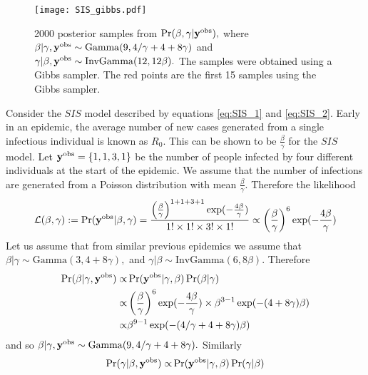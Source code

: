 \begin{figure}[htbp]
    \centering
    \texttt{[image: SIS\_gibbs.pdf]}
    \caption{
        2000 posterior samples from $\Pr(\beta, \gamma | \mathbf{y}^{\mathrm{obs}}),$ where
        $\beta|\gamma, \mathbf{y}^{\mathrm{obs}}
            \sim \mathrm{Gamma}(9, 4/\gamma + 4 + 8\gamma)$ and
        $\gamma|\beta, \mathbf{y}^{\mathrm{obs}}
            \sim \mathrm{InvGamma}(12, 12\beta).$ The samples were
        obtained using a Gibbs sampler.
        The red points are the first 15 samples using the Gibbs sampler.
    }
    \label{fig:gibbs_R}
\end{figure}

\begin{example}
    Consider the $SIS$ model described by equations \ref{eq:SIS_1}
    and \ref{eq:SIS_2}. Early in an epidemic, the average number of new
    cases generated from a single infectious individual is known as $R_0.$
    This can be shown to be $\frac{\beta}{\gamma}$ for the $SIS$ model.
    Let $\mathbf{y}^{\mathrm{obs}} = \{1, 1, 3, 1\}$ be the number of people infected by four
    different individuals at the start of the epidemic. We assume that the
    number of infections are generated from a Poisson distribution with mean
    $\frac{\beta}{\gamma}.$ Therefore the likelihood
    $$
        \mathcal{L}(\beta, \gamma):= \Pr(\mathbf{y}^{\mathrm{obs}} | \beta, \gamma)
        = \frac{
            \left(\frac{\beta}{\gamma}\right)^{1 + 1 + 3 + 1}
            \exp( -\frac{4\beta}{\gamma})
        }{
            1!\times 1! \times 3! \times 1!
        }
        \propto\left(\frac{\beta}{\gamma}\right)^{6}\exp( -\frac{4\beta}{\gamma})
    $$
    Let us assume that from similar previous epidemics we assume that
    $\beta | \gamma \sim \mathrm{Gamma}(3, 4 + 8\gamma),$ and
    $\gamma | \beta \sim \mathrm{InvGamma}(6, 8\beta).$ Therefore
    \begin{align*}
        \Pr(\beta|\gamma, \mathbf{y}^{\mathrm{obs}})
        \propto & \Pr(\mathbf{y}^{\mathrm{obs}}|\gamma, \beta)\Pr(\beta|\gamma)      \\
        \propto &
        \left(\frac{\beta}{\gamma}\right)^{6}
        \exp( -\frac{4\beta}{\gamma})
        \times \beta^{3 - 1}\exp(-(4 + 8\gamma)\beta)               \\
        \propto & \beta^{9 - 1}\exp(-(4/\gamma + 4 + 8\gamma)\beta)
    \end{align*}
    and so
    $\beta|\gamma, \mathbf{y}^{\mathrm{obs}}
        \sim \mathrm{Gamma}(9, 4/\gamma + 4 + 8\gamma).$
    Similarly
    \begin{align*}
        \Pr(\gamma|\beta, \by^\obs)
        \propto & \Pr(\by^\obs|\gamma, \beta)\Pr(\gamma|\beta)         \\

\end{align*}
\end{example}
